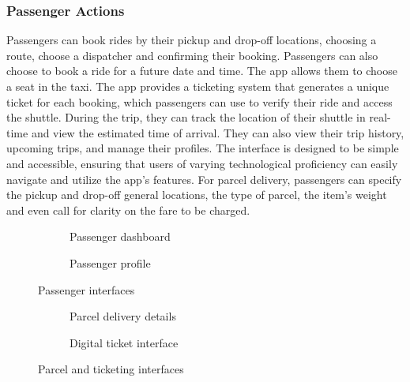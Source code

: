 \subsubsection{Passenger Actions}
Passengers can book rides by their pickup and drop-off locations, choosing a
route, choose a dispatcher and confirming their booking. Passengers can also
choose to book a ride for a future date and time. The app allows them to choose a
seat in the taxi. The app provides a ticketing system that generates a unique
ticket for each booking, which passengers can use to verify their ride and
access the shuttle. During the trip, they can track the location of their shuttle
in real-time and view the estimated time of arrival. They can also view their
trip history, upcoming trips, and manage their profiles. The interface is
designed to be simple and accessible, ensuring that users of varying
technological proficiency can easily navigate and utilize the app's features.
For parcel delivery, passengers can specify the pickup and drop-off general locations,
the type of parcel, the item's weight and even call for clarity on the fare to
be charged. 

\begin{figure}[H]
\centering
\begin{subfigure}[b]{0.35\textwidth}
    \centering
    \caption{Passenger dashboard}
\end{subfigure}
\hspace{0.1\textwidth}
\begin{subfigure}[b]{0.35\textwidth}
    \centering
    \caption{Passenger profile}
\end{subfigure}
\caption{Passenger interfaces}
\label{fig:passenger-booking}
\end{figure}

\begin{figure}[H]
\centering
\begin{subfigure}[b]{0.35\textwidth}
    \centering
    \caption{Parcel delivery details}
\end{subfigure}
\hspace{0.1\textwidth}
\begin{subfigure}[b]{0.35\textwidth}
    \centering
    \caption{Digital ticket interface}
\end{subfigure}
\caption{Parcel and ticketing interfaces}
\label{fig:parcel-ticketing}
\end{figure}

